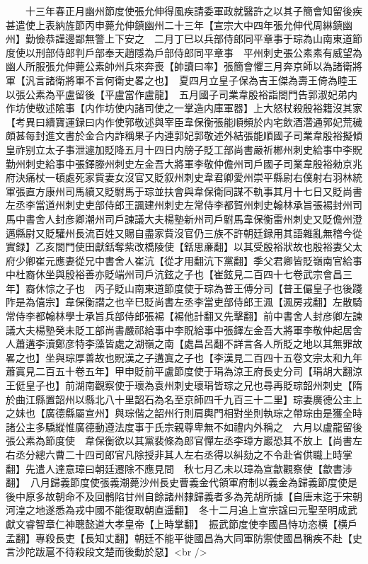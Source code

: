 　　十三年春正月幽州節度使張允伸得風疾請委軍政就醫許之以其子簡會知留後疾甚遣使上表納旌節丙申薨允伸鎮幽州二十三年【宣宗大中四年張允伸代周綝鎮幽州】勤儉恭謹邊鄙無警上下安之　二月丁巳以兵部侍郎同平章事于琮為山南東道節度使以刑部侍郎判戶部奉天趙隱為戶部侍郎同平章事　平州刺史張公素素有威望為幽人所服張允伸薨公素帥州兵來奔喪【帥讀曰率】張簡會懼三月奔京師以為諸衛將軍【汎言諸衛將軍不言何衛史畧之也】　夏四月立皇子保為吉王傑為壽王倚為睦王　以張公素為平盧留後【平盧當作盧龍】　五月國子司業韋殷裕詣閤門告郭淑妃弟内作坊使敬述隂事【内作坊使内諸司使之一掌造内庫軍器】上大怒杖殺殷裕籍沒其家　【考異曰續寶運録曰内作使郭敬述與宰臣韋保衡張能順頻於内宅飲酒濳通郭妃荒穢頗甚每封進文書於金合内詐稱果子内連郭妃郭敬述外結張能順國子司業韋殷裕擬傾皇祚别立太子事泄遽加貶降五月十四日内牓子貶工部尚書嚴祈郴州刺史給事中李貺勤州刺史給事中張鐸滕州刺史左金吾大將軍李敬仲儋州司戶國子司業韋殷裕勑京兆府決痛杖一頓處死家貲妻女沒官又貶叙州刺史韋君卿愛州崇平縣尉右僕射右羽林統軍張直方康州司馬續又貶駙馬于琮並扶會與韋保衛同謀不軌事其月十七日又貶尚書左丞李當道州刺史吏部侍郎王諷建州刺史左常侍李都賀州刺史翰林承旨張裼封州司馬中書舍人封彦卿潮州司戶諫議大夫楊塾新州司戶駙馬韋保衡雷州刺史又貶儋州澄邁縣尉又貶驩州長流百姓又賜自盡家貲沒官仍三族不許朝廷録用其語雜亂無稽今從實録】乙亥閤門使田獻銛奪紫改橋陵使【銛思亷翻】以其受殷裕狀故也殷裕妻父太府少卿崔元應妻從兄中書舍人崔沆【從才用翻沆下黨翻】季父君卿皆貶嶺南官給事中杜裔休坐與殷裕善亦貶端州司戶沆鉉之子也【崔鉉見二百四十七卷武宗會昌三年】裔休悰之子也　丙子貶山南東道節度使于琮為普王傅分司【普王儼皇子也後踐阼是為僖宗】韋保衡譛之也辛巳貶尚書左丞李當吏部侍郎王渢【渢房戎翻】左散騎常侍李都翰林學士承旨兵部侍郎張裼【裼他計翻又先擊翻】前中書舍人封彦卿左諫議大夫楊塾癸未貶工部尚書嚴祁給事中李貺給事中張鐸左金吾大將軍李敬仲起居舍人蕭遘李瀆鄭彦特李藻皆處之湖嶺之南【處昌呂翻不詳言各人所貶之地以其無罪故畧之也】坐與琮厚善故也貺漢之子遘寘之子也【李漢見二百四十五卷文宗太和九年蕭寘見二百五十卷五年】甲申貶前平盧節度使于琄為涼王府長史分司【琄胡大翻涼王侹皇子也】前湖南觀察使于瓌為袁州刺史瓌琄皆琮之兄也尋再貶琮韶州刺史【隋於曲江縣置韶州以縣北八十里韶石為名至京師四千九百三十二里】琮妻廣德公主上之妹也【廣德縣屬宣州】與琮偕之韶州行則肩輿門相對坐則執琮之帶琮由是獲全時諸公主多驕縱惟廣德動遵法度事于氏宗親尊卑無不如禮内外稱之　六月以盧龍留後張公素為節度使　韋保衡欲以其黨裴條為郎官憚左丞李璋方巖恐其不放上【尚書左右丞分總六曹二十四司郎官凡除授非其人左右丞得以糾劾之不令赴省供職上時掌翻】先遣人達意璋曰朝廷遷除不應見問　秋七月乙未以璋為宣歙觀察使【歙書涉翻】　八月歸義節度使張義潮薨沙州長史曹義金代領軍府制以義金為歸義節度使是後中原多故朝命不及回鶻陷甘州自餘諸州隸歸義者多為羌胡所據【自唐末迄于宋朝河湟之地遂悉為戎中國不能復取朝直遥翻】　冬十二月追上宣宗諡曰元聖至明成武獻文睿智章仁神聰懿道大孝皇帝【上時掌翻】　振武節度使李國昌恃功恣横【横戶孟翻】專殺長吏【長知丈翻】朝廷不能平徙國昌為大同軍防禦使國昌稱疾不赴【史言沙陀跋扈不待殺段文楚而後動於惡】<br />
